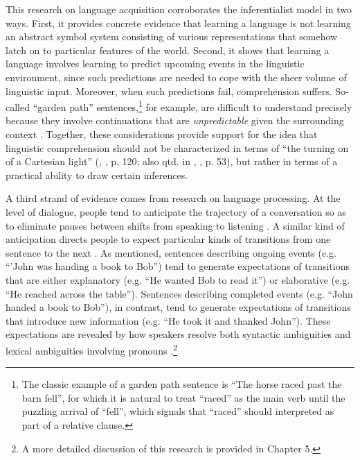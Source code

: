 This research on language acquisition corroborates the inferentialist model in two ways. First, it provides concrete evidence that learning a language is not learning an abstract symbol system consisting of various representations that somehow latch on to particular features of the world. Second, it shows that learning a language involves learning to predict upcoming events in the linguistic environment, since such predictions are needed to cope with the sheer volume of linguistic input. Moreover, when such predictions fail, comprehension suffers. So-called ``garden path'' sentences,\footnote{The classic example of a garden path sentence is ``The horse raced past the barn fell'', for which it is natural to treat ``raced'' as the main verb until the puzzling arrival of ``fell'', which signals that ``raced'' should interpreted as part of a relative clause.} for example, are difficult to understand precisely because they involve continuations that are \textit{unpredictable} given the surrounding context \citep{Christiansen:2015}. Together, these considerations provide support for the idea that linguistic comprehension should not be characterized in terms of ``the turning on of a Cartesian light'' (\citeauthor{Brandom:1994}, \citeyear{Brandom:1994}, p. 120; also qtd. in \citeauthor{Dennett:2010}, \citeyear{Dennett:2010}, p. 53), but rather in terms of a practical ability to draw certain inferences.

A third strand of evidence comes from research on language processing. At the level of dialogue, people tend to anticipate the trajectory of a conversation so as to eliminate pauses between shifts from speaking to listening \citep{Christiansen:2015,Pickering:2013}. A similar kind of anticipation directs people to expect particular kinds of transitions from one sentence to the next \citep{Rohde:2008}. As mentioned, sentences describing ongoing events (e.g. ``'John was handing a book to Bob'') tend to generate expectations of transitions that are either explanatory (e.g. ``He wanted Bob to read it'') or elaborative (e.g. ``He reached across the table''). Sentences describing completed events (e.g. ``John handed a book to Bob''), in contrast, tend to generate expectations of transitions that introduce new information (e.g. ``He took it and thanked John''). These expectations are revealed by how speakers resolve both syntactic ambiguities and lexical ambiguities involving pronouns \citep{Rohde:2008}.\footnote{A more detailed discussion of this research is provided in Chapter 5.}

